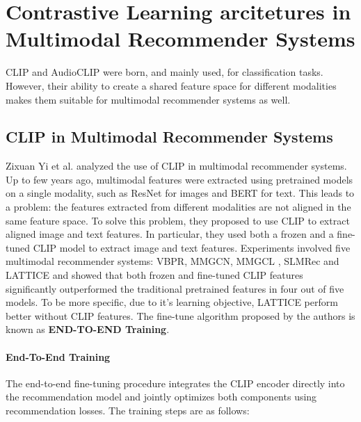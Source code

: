 \section{Contrastive Learning arcitetures in Multimodal Recommender Systems}
CLIP and AudioCLIP were born, and mainly used, for classification tasks. However, their ability to create a shared feature space for different modalities makes them suitable for multimodal recommender systems as well.
\subsection{CLIP in Multimodal Recommender Systems}
Zixuan Yi et al. \cite{CLIPRecSys} analyzed the use of CLIP in multimodal recommender systems. Up to few years ago, multimodal features were extracted using pretrained models on a single modality, such as ResNet for images and BERT for text. This leads to a problem: the features extracted from different modalities are not aligned in the same feature space. To solve this problem, they proposed to use CLIP to extract aligned image and text features. In particular, they used both a frozen and a fine-tuned CLIP model to extract image and text features. Experiments involved five multimodal recommender systems: VBPR, MMGCN, MMGCL , SLMRec  and LATTICE and showed that both frozen and fine-tuned CLIP features significantly outperformed the traditional pretrained features in four out of five models. To be more specific, due to it's learning objective, LATTICE perform better without CLIP features. The fine-tune algorithm proposed by the authors is known as \textbf{END-TO-END Training}.
\paragraph{End-To-End Training}
The end-to-end fine-tuning procedure integrates the CLIP encoder directly into the recommendation model and jointly optimizes both components using recommendation losses. The training steps are as follows:


